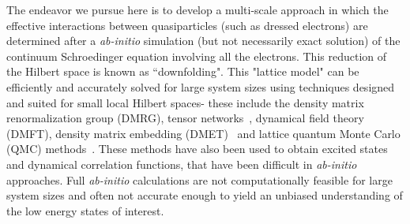 \documentclass[prl,12pt,onecolumn,nofootinbib,notitlepage,english,superscriptaddress]{revtex4-1}
\newcommand{\HJC}[1]{{\color{RED}{\bf HJC: #1}}}
\begin{document}

The endeavor we pursue here is to develop a multi-scale approach in which the effective interactions between 
quasiparticles (such as dressed electrons) are determined after a \emph{ab-initio} simulation (but not necessarily exact 
solution) of the continuum Schroedinger equation involving all the electrons. This reduction 
of the Hilbert space is known as ``downfolding". This "lattice model" can be efficiently and accurately 
solved for large system sizes using techniques designed and suited for small local Hilbert spaces- these include 
the density matrix renormalization group (DMRG), tensor networks~\cite{Verstraete,Changlani_CPS,Neuscamman_CPS}, 
dynamical field theory (DMFT), density matrix embedding (DMET)~\cite{Knizia_Chan_PRL,Knizia_Chan_JCP} 
and lattice quantum Monte Carlo (QMC) methods~\cite{Booth2009,SQMC,Sandvik_loops,Booth2013}. 
These methods have also been used to obtain excited states and dynamical correlation functions, that 
have been difficult in \emph{ab-initio} approaches. 
Full \emph{ab-initio} calculations are not computationally feasible for large system sizes 
and often not accurate enough to yield an unbiased understanding of the low energy states of interest. 
\end{document}
